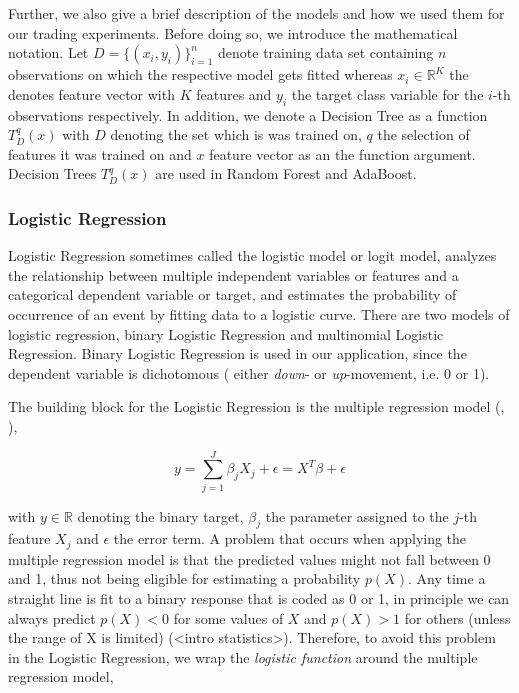 Further, we also give a brief description of the models and how we used them for our trading experiments.
Before doing so, we introduce the mathematical notation. 
Let $ D = \{ (x_{i}, y_{i}) \}_{i=1}^{n} $ denote training data set containing $ n $ observations on which the respective model gets fitted
whereas $ x_{i} \in \mathbb{R}^{K} $ the denotes feature vector with $K$ features and $ y_{i} $ the target class variable for the $ i $-th observations respectively.
In addition, we denote a Decision Tree \cite{breiman1984decisionTree} as a function $ T_{D}^{q}(x) $ with $ D $ denoting the set which is was trained on,
$ q $ the selection of features it was trained on and $ x $ feature vector as an the function argument.
Decision Trees $ T_{D}^{q}(x) $ are used in Random Forest and AdaBoost.



\subsubsection{Logistic Regression}
Logistic Regression sometimes called the logistic model or logit model,
analyzes the relationship between multiple independent variables or features and a
categorical dependent variable or target, and estimates the probability of occurrence
of an event by fitting data to a logistic curve. There are two models
of logistic regression, binary Logistic Regression and multinomial Logistic
Regression. Binary Logistic Regression is used in our application, since the dependent
variable is dichotomous ( either \emph{down}- or \emph{up}-movement, i.e. 0 or 1).

The building block for the Logistic Regression is the multiple regression model (\cite{james2013statisticalLearning}, \cite{park2013logisticRegression}),


\begin{equation}
    y = \sum_{j=1}^{J} \beta_{j} X_{j} + \epsilon =  X^{T}\beta + \epsilon
\end{equation}

with $y \in \mathbb{R}$ denoting the binary target, $\beta_{j}$ the parameter assigned to the $j$-th feature $X_{j}$ 
and $\epsilon$ the error term.
A problem that occurs when applying the multiple regression model is that the predicted values might
not fall between 0 and 1, thus not being eligible for estimating a probability $p(X)$.
Any time a straight line is fit to a binary response that is coded as
0 or 1, in principle we can always predict $p(X) < 0$ for some values of $X$
and $p(X) > 1$ for others (unless the range of X is limited) (<intro statistics>).
Therefore, to avoid this problem in the Logistic Regression, 
we wrap the \emph{logistic function} around the multiple regression model,

